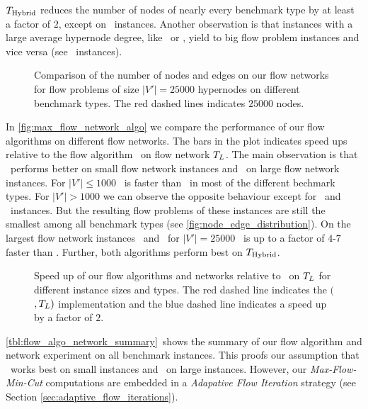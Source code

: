 $T_{\text{Hybrid}}$ reduces the number of nodes of nearly every benchmark type by at least a factor
of $2$, except on \SPM~instances. Another observation is that instances with a large average 
hypernode degree, like \Primal~or \Literal, yield to big flow problem instances and vice 
versa (see \Dual~instances).\\
\begin{figure}
\centering
\caption{Comparison of the number of nodes and edges on our flow networks for 
         flow problems of size $|V'| = 25000$ hypernodes on different benchmark types.
         The red dashed lines indicates $25000$ nodes.}
\label{fig:node_edge_distribution}
\end{figure} 
In \autoref{fig:max_flow_network_algo} we compare the performance of our flow algorithms on
different flow networks. The bars in the plot indicates speed ups relative to the flow algorithm
\EdmondKarp~on flow network $T_L$. The main observation is that \EdmondKarp~performs
better on small flow network instances and \GoldbergTarjan~on large flow network instances. For $|V'| \le 1000$
\EdmondKarp~is faster than \GoldbergTarjan~in most of the different bechmark types. For
$|V'| > 1000$ we can observe the opposite behaviour except for \DAC~and \Dual~instances. But the
resulting flow problems of these instances are still the smallest among all benchmark types
(see \autoref{fig:node_edge_distribution}). On the largest flow network instances \Primal~and
\Literal~for $|V'| = 25000$ \GoldbergTarjan~is up to a factor of $4$-$7$ faster than \EdmondKarp.
Further, both algorithms perform best on $T_{\text{Hybrid}}$.
\begin{figure}
\centering
\caption{Speed up of our flow algorithms and networks relative to \EdmondKarp~on
         $T_L$ for different instance sizes and types. The red dashed line indicates the
         $($\EdmondKarp$,T_L)$ implementation and the blue dashed line
         indicates a speed up by a factor of $2$.}
\label{fig:max_flow_network_algo}
\end{figure} 
\autoref{tbl:flow_algo_network_summary}~shows the summary of our flow algorithm and network experiment
on all benchmark instances. This proofs our assumption that \EdmondKarp~works best on small instances
and \GoldbergTarjan~on large instances. However, our \emph{Max-Flow-Min-Cut} computations
are embedded in a \emph{Adapative Flow Iteration} strategy (see Section \ref{sec:adaptive_flow_iterations}).
